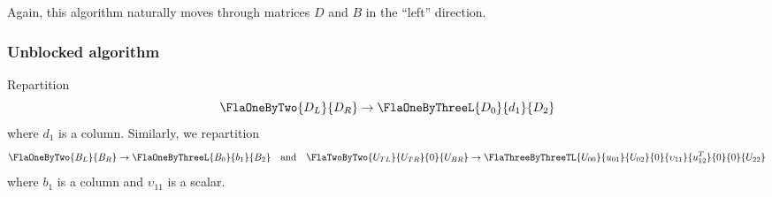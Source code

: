 Again, this algorithm naturally moves through matrices
$ D $ and $ B $ in the ``left'' direction.

\subsubsection{Unblocked algorithm}

Repartition
\[
  \FlaOneByTwo{ D_{L} }
              { D_{R} } \rightarrow
  \FlaOneByThreeL{ D_{0} }
                 { d_{1} }
                 { D_{2} }
\]
where
$ d_{1} $ is a column.
Similarly, we repartition 
\[ 
  \FlaOneByTwo{ B_{L} }
              { B_{R} } \rightarrow
  \FlaOneByThreeL{ B_{0} }
                 { b_{1} }
                 { B_{2} }
\quad \mbox{and} \quad
      \FlaTwoByTwo{ U_{TL} }{ U_{TR} }
                  {   0    }{ U_{BR} } \rightarrow
      \FlaThreeByThreeTL{ U_{00} } { u_{01}        } { U_{02}     }
                        {   0    } { \upsilon_{11} } { u_{12}^{T} }
                        {   0    } {    0          } { U_{22}     }  
\]
where $ b_{1} $ is a column and $ \upsilon_{11} $ is a scalar.

